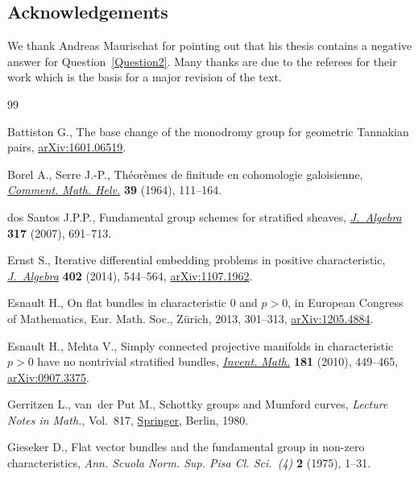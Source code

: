 \documentclass[10pt,a4paper]{amsart}
\numberwithin{equation}{section}
\begin{document}
\subsection*{Acknowledgements} We thank Andreas Maurischat for pointing out that his thesis contains a negative answer for Question~\ref{Question2}. Many thanks are due to the referees for their work which is the basis for a major revision of the text.


\begin{thebibliography}{99}
\footnotesize\itemsep=0pt

Battiston G., The base change of the monodromy group for geometric {T}annakian
 pairs, \href{https://arxiv.org/abs/1601.06519}{arXiv:1601.06519}.

Borel A., Serre J.-P., Th\'eor\`emes de finitude en cohomologie galoisienne,
 \href{https://doi.org/10.1007/BF02566948}{\textit{Comment. Math. Helv.}} \textbf{39} (1964), 111--164.

dos Santos J.P.P., Fundamental group schemes for stratified sheaves,
 \href{https://doi.org/10.1016/j.jalgebra.2007.03.005}{\textit{J.~Algebra}} \textbf{317} (2007), 691--713.

Ernst S., Iterative differential embedding problems in positive characteristic,
 \href{https://doi.org/10.1016/j.jalgebra.2013.12.023}{\textit{J.~Algebra}} \textbf{402} (2014), 544--564, \href{https://arxiv.org/abs/1107.1962}{arXiv:1107.1962}.

Esnault H., On flat bundles in characteristic 0 and {$p>0$}, in European
 {C}ongress of {M}athematics, Eur. Math. Soc., Z\"{u}rich, 2013, 301--313,
 \href{https://arxiv.org/abs/1205.4884}{arXiv:1205.4884}.

Esnault H., Mehta V., Simply connected projective manifolds in characteristic
 {$p>0$} have no nontrivial stratified bundles, \href{https://doi.org/10.1007/s00222-010-0250-2}{\textit{Invent. Math.}}
 \textbf{181} (2010), 449--465, \href{https://arxiv.org/abs/0907.3375}{arXiv:0907.3375}.

Gerritzen L., van~der Put M., Schottky groups and {M}umford curves,
 \textit{Lecture Notes in Math.}, Vol.~817, \href{https://doi.org/10.1007/BFb0089957}{Springer}, Berlin, 1980.

Gieseker D., Flat vector bundles and the fundamental group in non-zero
 characteristics, \textit{Ann. Scuola Norm. Sup. Pisa Cl. Sci.~(4)} \textbf{2}
 (1975), 1--31.


\end{thebibliography}
\end{document}
